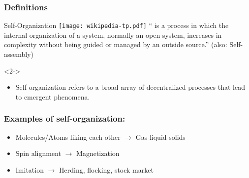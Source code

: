 \begin{frame}
  \frametitle{Definitions}

  \begin{block}{Self-Organization
      \hfill
      \texttt{[image: wikipedia-tp.pdf]}
    }
    `` is a process in which the internal organization 
    of a system, normally an open system, increases in complexity without 
    being guided or managed by an outside source.''
    (also: Self-assembly)
  \end{block}

  \medskip

  \begin{block}<2->{}
    \begin{itemize}
    \item<2-> 
      Self-organization refers to a broad array of decentralized processes 
      that lead to emergent phenomena.
    \end{itemize}
  \end{block}

\end{frame}


 \begin{frame}
   \frametitle{Examples of self-organization:}

   \begin{block}{}
     \begin{itemize}
     \item
       Molecules/Atoms liking each other $\rightarrow$ Gas-liquid-solids
     \item
       Spin alignment $\rightarrow$ Magnetization
     \item 
       Imitation $\rightarrow$ Herding, flocking, stock market
     \end{itemize}

     \medskip

   \end{block}

 \end{frame}


